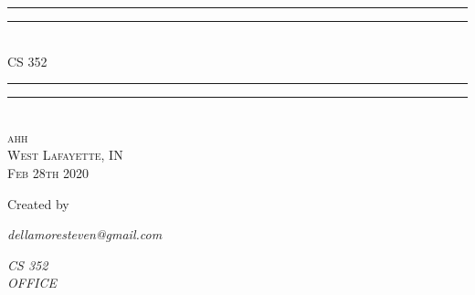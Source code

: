 \documentclass[12pt]{report}
\newlength{\drop}
\begin{document}
  \begin{titlepage}
    \centering
    \textheight
    \vspace*{7\baselineskip}
    \rule{\textwidth}{1.6pt}\vspace*{-\baselineskip}\vspace*{2pt}
    \rule{\textwidth}{0.4pt}\\[\baselineskip]
    {\LARGE CS 352}\\[0.2\baselineskip]
    \rule{\textwidth}{0.4pt}\vspace*{-\baselineskip}\vspace{3.2pt}
    \rule{\textwidth}{1.6pt}\\[\baselineskip]
    \scshape
    ahh \\
    West Lafayette, IN \\
    Feb 28th 2020\par
    \vspace*{2\baselineskip}
    Created by \\[\baselineskip]
    {\Large \par}
    {\itshape dellamoresteven@gmail.com\par}
    {\itshape CS 352 \\ OFFICE\par}
  \end{titlepage}
\end{document}
